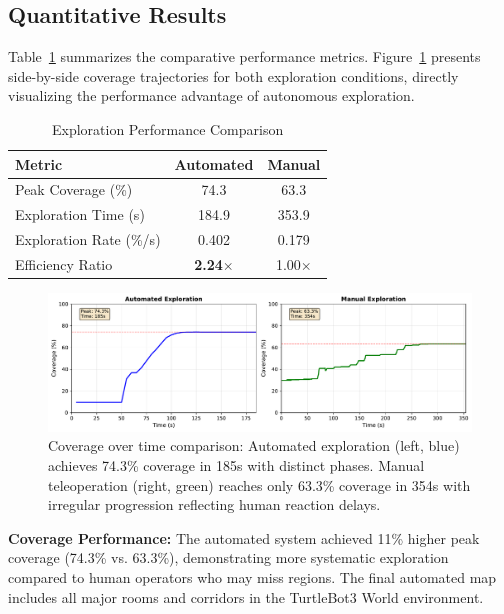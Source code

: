 \documentclass[conference]{IEEEtran}
\begin{document}
\subsection{Quantitative Results}

Table~\ref{tab:results} summarizes the comparative performance metrics. Figure~\ref{fig:coverage} presents side-by-side coverage trajectories for both exploration conditions, directly visualizing the performance advantage of autonomous exploration.

\begin{table}[h]
\centering
\caption{Exploration Performance Comparison}
\label{tab:results}
\begin{tabular}{lcc}
\toprule
\textbf{Metric} & \textbf{Automated} & \textbf{Manual} \\
\midrule
Peak Coverage (\%) & 74.3 & 63.3 \\
Exploration Time (s) & 184.9 & 353.9 \\
Exploration Rate (\%/s) & 0.402 & 0.179 \\
Efficiency Ratio & \textbf{2.24$\times$} & 1.00$\times$ \\
\bottomrule
\end{tabular}
\end{table}

\begin{figure}[t]
\centering
\includegraphics[width=\columnwidth]{figures/coverage_comparison.pdf}
\caption{Coverage over time comparison: Automated exploration (left, blue) achieves 74.3\% coverage in 185s with distinct phases. Manual teleoperation (right, green) reaches only 63.3\% coverage in 354s with irregular progression reflecting human reaction delays.}
\label{fig:coverage}
\end{figure}

\textbf{Coverage Performance:} The automated system achieved 11\% higher peak coverage (74.3\% vs. 63.3\%), demonstrating more systematic exploration compared to human operators who may miss regions. The final automated map includes all major rooms and corridors in the TurtleBot3 World environment.
\end{document}
